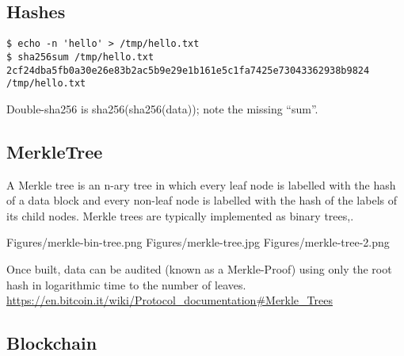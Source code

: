 \subsection{Hashes}

\begin{verbatim}
$ echo -n 'hello' > /tmp/hello.txt
$ sha256sum /tmp/hello.txt
2cf24dba5fb0a30e26e83b2ac5b9e29e1b161e5c1fa7425e73043362938b9824  /tmp/hello.txt
\end{verbatim}

Double-sha256 is sha256(sha256(data)); note the missing ``sum''.

\subsection{MerkleTree}

A Merkle tree is an n-ary tree in which every leaf node is labelled
with the hash of a data block and every non-leaf node is labelled with
the hash of the labels of its child nodes.  Merkle trees are typically
implemented as binary trees,.

Figures/merkle-bin-tree.png
Figures/merkle-tree.jpg
Figures/merkle-tree-2.png

Once built, data can be audited (known as a Merkle-Proof) using only
the root hash in logarithmic time to the number of leaves.
\url{https://en.bitcoin.it/wiki/Protocol_documentation#Merkle_Trees}

\subsection{Blockchain}
